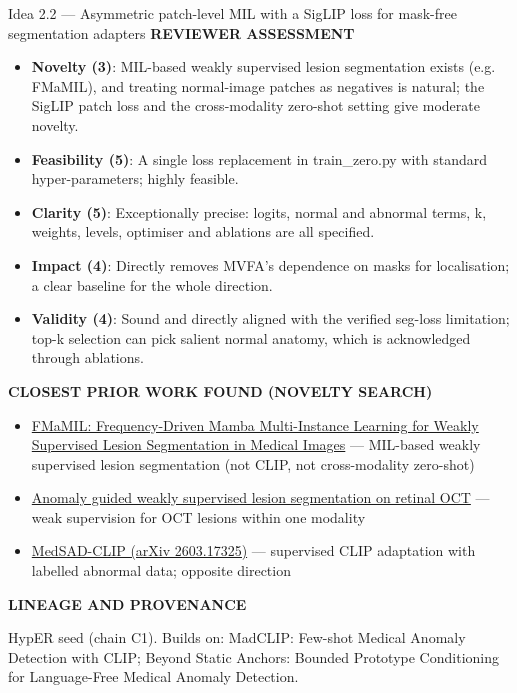 \documentclass[11pt,a4paper]{article}
\newcommand{\lbl}[1]{{\sffamily\footnotesize\bfseries\color{muted}\MakeUppercase{#1}}\par}
\begin{document}
\begin{ideabox}{Idea 2.2 — Asymmetric patch-level MIL with a SigLIP loss for mask-free segmentation adapters}
\lbl{Reviewer assessment}\begin{itemize}[leftmargin=1.2em,itemsep=1pt,topsep=2pt]
\item \textbf{Novelty (3)}: MIL-based weakly supervised lesion segmentation exists (e.g. FMaMIL), and treating normal-image patches as negatives is natural; the SigLIP patch loss and the cross-modality zero-shot setting give moderate novelty.
\item \textbf{Feasibility (5)}: A single loss replacement in train\_\allowbreak{}zero.py with standard hyper-parameters; highly feasible.
\item \textbf{Clarity (5)}: Exceptionally precise: logits, normal and abnormal terms, k, weights, levels, optimiser and ablations are all specified.
\item \textbf{Impact (4)}: Directly removes MVFA's dependence on masks for localisation; a clear baseline for the whole direction.
\item \textbf{Validity (4)}: Sound and directly aligned with the verified seg-loss limitation; top-k selection can pick salient normal anatomy, which is acknowledged through ablations.
\end{itemize}
\lbl{Closest prior work found (novelty search)}\begin{itemize}[leftmargin=1.2em,itemsep=1pt,topsep=2pt]
\item \href{https://arxiv.org/pdf/2506.07652}{FMaMIL: Frequency-Driven Mamba Multi-Instance Learning for Weakly Supervised Lesion Segmentation in Medical Images} — MIL-based weakly supervised lesion segmentation (not CLIP, not cross-modality zero-shot)
\item \href{https://researchconnect.stonybrook.edu/en/publications/anomaly-guided-weakly-supervised-lesion-segmentation-on-retinal-o/}{Anomaly guided weakly supervised lesion segmentation on retinal OCT} — weak supervision for OCT lesions within one modality
\item \href{https://arxiv.org/pdf/2603.17325}{MedSAD-CLIP (arXiv 2603.17325)} — supervised CLIP adaptation with labelled abnormal data; opposite direction
\end{itemize}
\lbl{Lineage and provenance}{\small HypER seed (chain C1). Builds on: MadCLIP: Few-shot Medical Anomaly Detection with CLIP; Beyond Static Anchors: Bounded Prototype Conditioning for Language-Free Medical Anomaly Detection.}
\end{ideabox}
\end{document}
